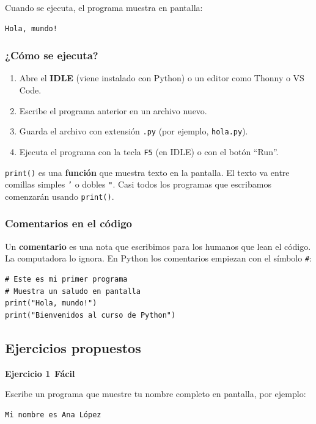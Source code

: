 \documentclass[11pt,a4paper]{article}
\newcommand{\facil}{\textcolor{verdeSignal}{\faIcon{circle}\,\textbf{Fácil}}}
\begin{document}
Cuando se ejecuta, el programa muestra en pantalla:

\begin{lstlisting}[style=pythonStyle]
Hola, mundo!
\end{lstlisting}

\subsubsection{¿Cómo se ejecuta?}

\begin{enumerate}
    \item Abre el \textbf{IDLE} (viene instalado con Python) o un editor como Thonny o VS Code.
    \item Escribe el programa anterior en un archivo nuevo.
    \item Guarda el archivo con extensión \texttt{.py} (por ejemplo, \texttt{hola.py}).
    \item Ejecuta el programa con la tecla \texttt{F5} (en IDLE) o con el botón ``Run''.
\end{enumerate}

\begin{cajaConcepto}
\texttt{print()} es una \textbf{función} que muestra texto en la pantalla. El texto va entre comillas simples \texttt{'} o dobles \texttt{"}. Casi todos los programas que escribamos comenzarán usando \texttt{print()}.
\end{cajaConcepto}

\subsubsection{Comentarios en el código}

Un \textbf{comentario} es una nota que escribimos para los humanos que lean el código. La computadora lo ignora. En Python los comentarios empiezan con el símbolo \texttt{\#}:

\begin{lstlisting}[style=pythonStyle, caption={Programa con comentarios}]
# Este es mi primer programa
# Muestra un saludo en pantalla
print("Hola, mundo!")
print("Bienvenidos al curso de Python")
\end{lstlisting}

\subsection{Ejercicios propuestos}

\begin{cajaEjercicio}
\textbf{Ejercicio 1} \facil

Escribe un programa que muestre tu nombre completo en pantalla, por ejemplo:
\begin{lstlisting}[style=pythonStyle]
Mi nombre es Ana López
\end{lstlisting}
\end{cajaEjercicio}
\end{document}
